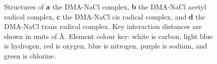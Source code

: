 \begin{figure}[!htbp]
	\centering


\caption[Structures of the DMA-NaCl complex and associated radical
complexes.]{Structures of \textbf{a} the DMA-NaCl complex, \textbf{b} the
DMA-NaCl acetyl radical complex, \textbf{c} the DMA-NaCl cis
radical complex, and \textbf{d} the DMA-NaCl trans radical complex. Key
interaction distances are shown in units of \AA. Element colour key: white is
carbon, light blue is hydrogen, red is oxygen, blue is nitrogen, purple is
sodium, and green is chlorine.} \label{fig:dma-na-cl}
\end{figure}

